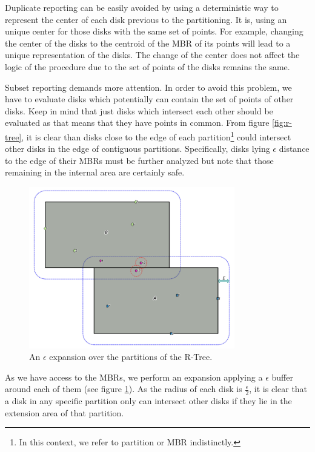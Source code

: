 \documentclass[12pt]{scrartcl}
\begin{document}
Duplicate reporting can be easily avoided by using a deterministic way to represent the center of each disk previous to the partitioning.  It is, using an unique center for those disks with the same set of points.  For example, changing the center of the disks to the centroid of the MBR of its points will lead to a unique representation of the disks.  The change of the center does not affect the logic of the procedure due to the set of points of the disks remains the same.

Subset reporting demands more attention.  In order to avoid this problem, we have to evaluate disks which potentially can contain the set of points of other disks.  Keep in mind that just disks which intersect each other should be evaluated as that means that they have points in common. From figure \ref{fig:r-tree}, it is clear than disks close to the edge of each partition\footnote{In this context, we refer to partition or MBR indistinctly.} could intersect other disks in the edge of contiguous partitions. Specifically, disks lying $\epsilon$ distance to the edge of their MBRs must be further analyzed but note that those remaining in the internal area are certainly safe. 

\begin{figure}
	\centering
	\begin{center}
	\includegraphics[width=0.8\textwidth]{./Figures/expansion}
\end{center}
	\caption{An $\epsilon$ expansion over the partitions of the R-Tree.}
	\label{fig:expansion}
\end{figure}

As we have access to the MBRs, we perform an expansion applying a $\epsilon$ buffer around each of them (see figure \ref{fig:expansion}). As the radius of each disk is $\frac{\epsilon}{2}$, it is clear that a disk in any specific partition only can intersect other disks if they lie in the extension area of that partition.  
\end{document}
